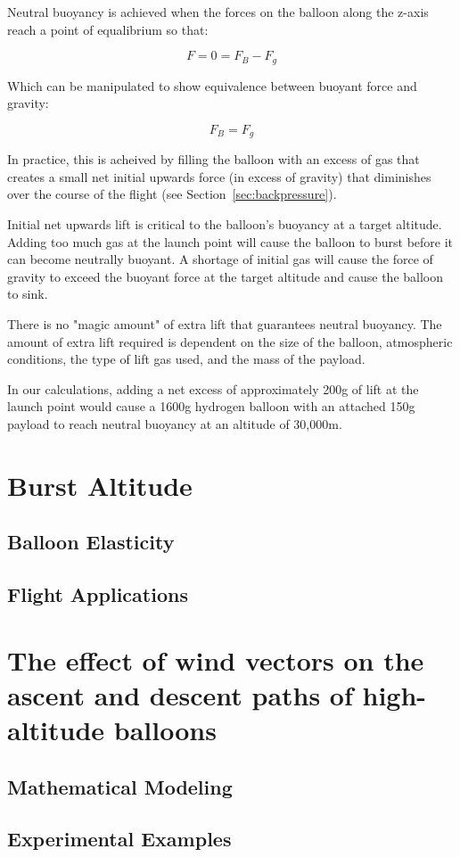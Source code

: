 \documentclass[usenatbib]{mn2e}
\begin{document}
Neutral buoyancy is achieved when the forces on the balloon along the z-axis reach a point of equalibrium so that:

\begin{equation}
	F = 0 = F_B - F_g
\end{equation}

Which can be manipulated to show equivalence between buoyant force and gravity:

\begin{equation}
	F_B = F_g
\end{equation}

In practice, this is acheived by filling the balloon with an excess of gas that creates a small net initial upwards force (in excess of gravity) that diminishes over the course of the flight (see Section~\ref{sec:backpressure}).

Initial net upwards lift is critical to the balloon's buoyancy at a target altitude. Adding too much gas at the launch point will cause the balloon to burst before it can become neutrally buoyant. A shortage of initial gas will cause the force of gravity to exceed the buoyant force at the target altitude and cause the balloon to sink.

There is no "magic amount" of extra lift that guarantees neutral buoyancy. The amount of extra lift required is dependent on the size of the balloon, atmospheric conditions, the type of lift gas used, and the mass of the payload.

In our calculations, adding a net excess of approximately 200g of lift at the launch point would cause a 1600g hydrogen balloon with an attached 150g payload to reach neutral buoyancy at an altitude of 30,000m.

\section{Burst Altitude}

\subsection{Balloon Elasticity}

\subsection{Flight Applications}

\section{The effect of wind vectors on the ascent and descent paths of high-altitude balloons}

\subsection{Mathematical Modeling}
\subsection{Experimental Examples}

\label{lastpage}

\end{document}
